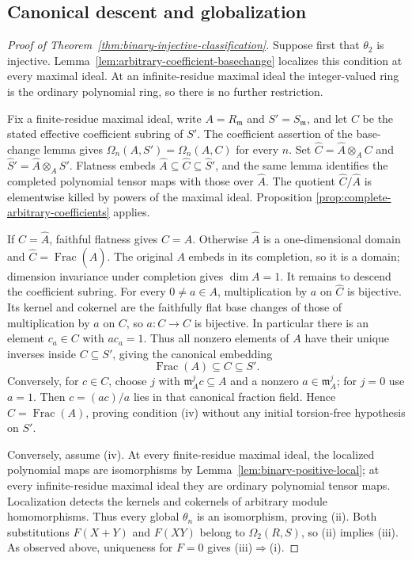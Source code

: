 \subsection{Canonical descent and globalization}

\begin{proof}[Proof of Theorem~\ref{thm:binary-injective-classification}]
Suppose first that $\theta_2$ is injective.
Lemma~\ref{lem:arbitrary-coefficient-basechange} localizes this
condition at every maximal ideal.  At an infinite-residue
maximal ideal the integer-valued ring is the ordinary polynomial
ring, so there is no further restriction.

Fix a finite-residue maximal ideal, write
$A=R_{\mathfrak m}$ and $S'=S_{\mathfrak m}$, and let $C$ be
the stated effective coefficient subring of $S'$.
The coefficient assertion of the base-change lemma gives
$\Omega_n(A,S')=\Omega_n(A,C)$ for every $n$.
Set $\widehat C=\widehat A\otimes_A C$ and
$\widehat S'=\widehat A\otimes_A S'$.
Flatness embeds $\widehat A\subseteq\widehat C\subseteq\widehat S'$,
and the same lemma identifies the completed polynomial tensor
maps with those over $\widehat A$.
The quotient $\widehat C/\widehat A$ is elementwise killed by
powers of the maximal ideal.  Proposition
\ref{prop:complete-arbitrary-coefficients} applies.

If $\widehat C=\widehat A$, faithful flatness gives $C=A$.
Otherwise $\widehat A$ is a one-dimensional domain and
$\widehat C=\operatorname{Frac}(\widehat A)$.
The original $A$ embeds in its completion, so it is a domain;
dimension invariance under completion gives $\dim A=1$.
It remains to descend the coefficient subring.
For every $0\ne a\in A$, multiplication by $a$ on
$\widehat C$ is bijective.  Its kernel and cokernel are the
faithfully flat base changes of those of multiplication by
$a$ on $C$, so $a:C\to C$ is bijective.
In particular there is an element $c_a\in C$ with $ac_a=1$.
Thus all nonzero elements of $A$ have their unique inverses
inside $C\subseteq S'$, giving the canonical embedding
\[
 \operatorname{Frac}(A)\subseteq C\subseteq S'.
\]
Conversely, for $c\in C$, choose $j$ with
$\mathfrak m_A^jc\subseteq A$ and a nonzero
$a\in\mathfrak m_A^j$; for $j=0$ use $a=1$.
Then $c=(ac)/a$ lies in that canonical fraction field.
Hence $C=\operatorname{Frac}(A)$, proving condition
\textup{(iv)} without any initial torsion-free hypothesis on $S'$.

Conversely, assume \textup{(iv)}.
At every finite-residue maximal ideal, the localized polynomial
maps are isomorphisms by Lemma~\ref{lem:binary-positive-local};
at every infinite-residue maximal ideal they are ordinary
polynomial tensor maps.  Localization detects the kernels and
cokernels of arbitrary module homomorphisms.  Thus every global
$\theta_n$ is an isomorphism, proving \textup{(ii)}.
Both substitutions $F(X+Y)$ and $F(XY)$ belong to
$\Omega_2(R,S)$, so \textup{(ii)} implies \textup{(iii)}.
As observed above, uniqueness for $F=0$ gives
\textup{(iii)}$\Rightarrow$\textup{(i)}.


\end{proof}
